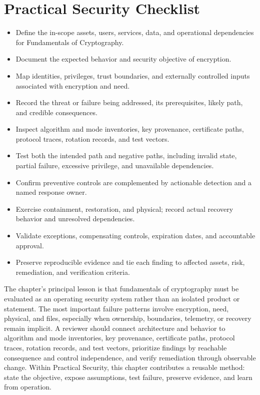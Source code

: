 \documentclass[11pt]{article}
\begin{document}
\section*{Practical Security Checklist}
\begin{itemize}[label=$\square$]
\item Define the in-scope assets, users, services, data, and operational dependencies for Fundamentals of Cryptography.
\item Document the expected behavior and security objective of encryption.
\item Map identities, privileges, trust boundaries, and externally controlled inputs associated with encryption and need.
\item Record the threat or failure being addressed, its prerequisites, likely path, and credible consequences.
\item Inspect algorithm and mode inventories, key provenance, certificate paths, protocol traces, rotation records, and test vectors.
\item Test both the intended path and negative paths, including invalid state, partial failure, excessive privilege, and unavailable dependencies.
\item Confirm preventive controls are complemented by actionable detection and a named response owner.
\item Exercise containment, restoration, and physical; record actual recovery behavior and unresolved dependencies.
\item Validate exceptions, compensating controls, expiration dates, and accountable approval.
\item Preserve reproducible evidence and tie each finding to affected assets, risk, remediation, and verification criteria.
\end{itemize}
\begin{synthesisbox}
The chapter's principal lesson is that fundamentals of cryptography must be evaluated as an operating security system rather than an isolated product or statement. The most important failure patterns involve encryption, need, physical, and files, especially when ownership, boundaries, telemetry, or recovery remain implicit. A reviewer should connect architecture and behavior to algorithm and mode inventories, key provenance, certificate paths, protocol traces, rotation records, and test vectors, prioritize findings by reachable consequence and control independence, and verify remediation through observable change. Within Practical Security, this chapter contributes a reusable method: state the objective, expose assumptions, test failure, preserve evidence, and learn from operation.
\end{synthesisbox}
\end{document}
